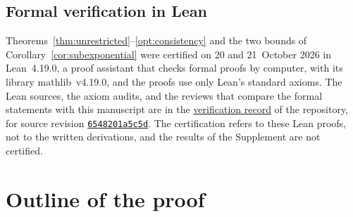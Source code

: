 \documentclass[11pt,letterpaper]{article}
\newif\ifshowrev
\newcommand{\rs}[1]{\ifshowrev{\color{revblue}#1}\else#1\fi}
\newif\ifshowskill
\newcommand{\skl}[1]{\ifshowskill{\color{revblue}%
\hypersetup{linkcolor=revblue,citecolor=revblue,urlcolor=revblue}#1}\else#1\fi}
\newcommand{\sks}[1]{\ifshowskill{\color{revblue}#1}\else#1\fi}
\theoremstyle{remark}
\begin{document}
\subsection{\texorpdfstring{\sks{Formal verification in Lean}}{Formal verification in Lean}}\label{sec:lean-certification}
\leavevmode\skl{Theorems~\ref{thm:unrestricted}--\ref{opt:consistency} and the two bounds of
Corollary~\ref{cor:subexponential} were certified on 20 and 21~October 2026
in Lean~4.19.0, a proof assistant that checks formal proofs by computer,
with its library mathlib~v4.19.0, and the proofs use only Lean's standard
axioms. The Lean sources, the axiom audits, and the reviews that compare the
formal statements with this manuscript are in the
\href{https://github.com/VC2015/HDCLTs/blob/bbf1ab99c733a398c181ca8c9f5a243a41f258c6/verification/2026-10-21-companion-results/README.md}{verification record}
of the repository, for source revision
\href{https://github.com/VC2015/HDCLTs/commit/6548201a5c5d9c132a53f1d504f7ef70346aa782}{\texttt{6548201a5c5d}}.
The certification refers to these Lean proofs, not to the written
derivations, and the results of the Supplement are not certified.}


\section{\texorpdfstring{\rs{Outline of the proof}}{Outline of the proof}}
\label{sec:smoothing}
\end{document}
